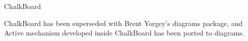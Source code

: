 \begin{hcarentry}{ChalkBoard}
\label{chalkboard}
\makeheader

ChalkBoard has been superseded with Brent Yorgey's diagrams package,
and Active mechanism developed inside ChalkBoard has been ported to diagrams.

\end{hcarentry}
